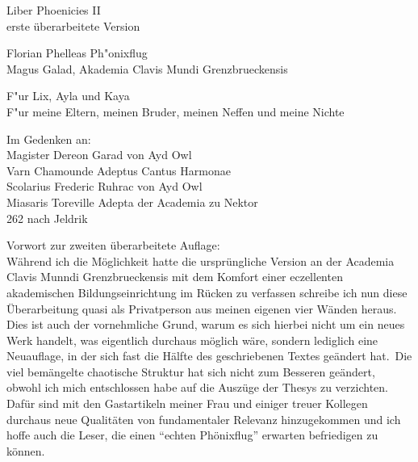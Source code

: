 \documentclass[a5paper,8pt]{book}
\begin{document}
%



\begin{center}
Liber Phoenicies II\\
erste überarbeitete Version\\

\vspace{30mm}

Florian Phelleas Ph"onixflug\\
Magus Galad, Akademia Clavis Mundi Grenzbrueckensis\\

\vspace{10mm}

F"ur Lix, Ayla und Kaya\\
F"ur meine Eltern, meinen Bruder, meinen Neffen und meine Nichte\\


\vspace{10mm}

Im Gedenken an: \\
Magister Dereon Garad von Ayd Owl \\
Varn Chamounde Adeptus Cantus Harmonae \\
Scolarius Frederic Ruhrac von Ayd Owl \\
Miasaris Toreville Adepta der Academia zu Nektor \\
262 nach Jeldrik\\
\end{center}

\newpage

Vorwort zur zweiten überarbeitete Auflage:\\
Während ich die Möglichkeit hatte die ursprüngliche Version an der Academia Clavis Munndi Grenzbrueckensis mit dem Komfort einer eczellenten akademischen Bildungseinrichtung im
Rücken zu verfassen schreibe ich nun diese Überarbeitung quasi als Privatperson aus meinen eigenen vier Wänden heraus. Dies ist auch der vornehmliche Grund, warum es sich hierbei
nicht um ein neues Werk handelt, was eigentlich durchaus möglich wäre, sondern lediglich eine Neuauflage, in der sich fast die Hälfte des geschriebenen Textes geändert hat.\
Die viel bemängelte chaotische Struktur hat sich nicht zum Besseren geändert, obwohl ich mich entschlossen habe auf die Auszüge der Thesys zu verzichten. Dafür sind mit den
Gastartikeln meiner Frau und einiger treuer Kollegen durchaus neue Qualitäten von fundamentaler Relevanz hinzugekommen und ich hoffe auch die Leser, die einen ``echten
Phönixflug'' erwarten befriedigen zu können.\\
\end{document}
